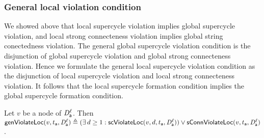 



\subsubsection{General local violation condition}


We showed above that local supercycle violation implies global supercycle violation, and local
strong connecteness violation implies global string conectedness violation.  The general global
supercycle violation condition is the disjunction of global supercycle violation and global strong
connecteness violation.  Hence we formulate the general local supercycle violation condition as the
disjunction of local supercycle violation and local strong connecteness violation.  It follows that
the local supercycle formation condition implies the global supercycle formation condition.



\label{def:locFormation.violation}
Let $v$ be a node of $\mathit{D}_{\mathsf{a}}^{\ell}$.
Then $\mathsf{genViolateLoc}(v,t_{\mathsf{a}},\mathit{D}_{\mathsf{a}}^{\ell})  \triangleq  (\exists\, d \ge 1: \mathsf{scViolateLoc}(v,d,t_{\mathsf{a}},\mathit{D}_{\mathsf{a}}^{\ell})) \lor \mathsf{sConnViolateLoc}(v,t_{\mathsf{a}},\mathit{D}_{\mathsf{a}}^{\ell})$.
\ed
%


